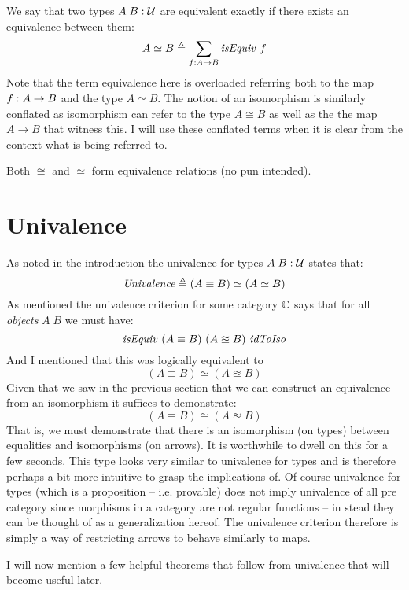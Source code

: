 We say that two types $A\;B \mathrel{:} \mathcal{U}$ are equivalent exactly if there exists an
equivalence between them:
%
\begin{equation}
\label{eq:equivalence}
A \simeq B \defeq \sum_{f \tp A \to B} \isEquiv\ f
\end{equation}
%
Note that the term equivalence here is overloaded referring both to the map $f
\mathrel{:} A \to B$ and the type $A \simeq B$. The notion of an isomorphism is
similarly conflated as isomorphism can refer to the type $A \cong B$ as well as
the the map $A \to B$ that witness this. I will use these conflated terms when
it is clear from the context what is being referred to.

Both $\cong$ and $\simeq$ form equivalence relations (no pun intended).

\section{Univalence}
\label{sec:univalence}
As noted in the introduction the univalence for types $A\; B \mathrel{:} \mathcal{U}$ states
that:
%
$$
\mathit{Univalence} \mathrel{\triangleq} (A \equiv B) \simeq (A \simeq B)
$$
%
As mentioned the univalence criterion for some category $\mathbb{C}$ says that for all
\emph{objects} $A\;B$ we must have:
$$
\isEquiv\ (A \equiv B)\ (A \approxeq B)\ \idToIso
$$
And I mentioned that this was logically equivalent to
%
$$
(A \equiv B) \simeq (A \approxeq B)
$$
%
Given that we saw in the previous section that we can construct an equivalence
from an isomorphism it suffices to demonstrate:
%
$$
(A \equiv B) \cong (A \approxeq B)
$$
%
That is, we must demonstrate that there is an isomorphism (on types) between
equalities and isomorphisms (on arrows). It is worthwhile to dwell on this for a
few seconds. This type looks very similar to univalence for types and is
therefore perhaps a bit more intuitive to grasp the implications of. Of course
univalence for types (which is a proposition -- i.e. provable) does not imply
univalence of all pre category since morphisms in a category are not regular
functions -- in stead they can be thought of as a generalization hereof. The univalence criterion therefore is simply a way of restricting arrows
to behave similarly to maps.

I will now mention a few helpful theorems that follow from univalence that will
become useful later.

